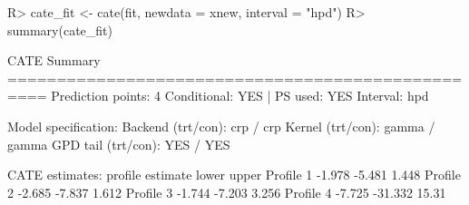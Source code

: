 \documentclass[article]{jss}\usepackage[]{graphicx}\usepackage[]{xcolor}
\renewenvironment{Schunk}{\vspace{0pt}}{\vspace{-0.1\baselineskip}}
\begin{document}
\begin{table}
\centering
\caption{\label{tab:xnew-results}Representative Lalonde participant profiles used as new-data inputs for the conditional causal contrasts reported in Figure~\ref{fig:cate_plot} and in the printed CQTE summary below. Columns (Profile~1--Profile~4) give the covariate values for one synthetic individual on the original data scale:  (years),  (years of schooling), , , , and prior annual earnings  and  (US dollars).}
\centering
{}
\end{table}



\begin{Schunk}
\begin{Sinput}
R> cate_fit <- cate(fit, newdata = xnew, interval = "hpd")
R> summary(cate_fit)
\end{Sinput}
\begin{Soutput}
CATE Summary
================================================== 
Prediction points: 4
Conditional: YES | PS used: YES
Interval: hpd

Model specification:
  Backend (trt/con): crp / crp
  Kernel (trt/con): gamma / gamma
  GPD tail (trt/con): YES / YES

CATE estimates:
   profile estimate   lower upper
 Profile 1   -1.978  -5.481 1.448
 Profile 2   -2.685  -7.837 1.612
 Profile 3   -1.744  -7.203 3.256
 Profile 4   -7.725 -31.332 15.31
\end{Soutput}
\end{Schunk}
\end{document}
